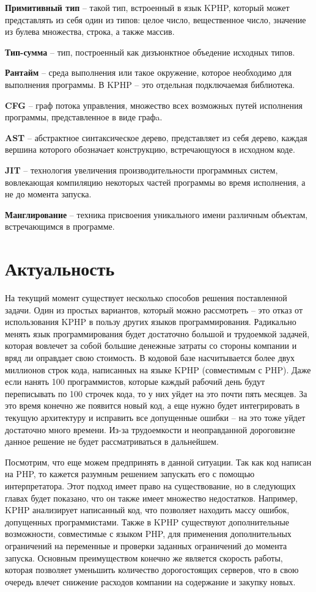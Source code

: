 \textbf{Примитивный тип} -- такой тип, встроенный в язык KPHP, который может представлять из себя один из типов: целое число, вещественное число, значение из булева множества, строка, а также массив.

\textbf{Тип-сумма} -- тип, построенный как дизъюнктное объедение исходных типов.

\textbf{Рантайм} -- среда выполнения или такое окружение, которое необходимо для выполнения программы. В KPHP -- это отдельная подключаемая библиотека.

\textbf{CFG} -- граф потока управления, множество всех возможных путей исполнения программы, представленное в виде графa.

\textbf{AST} -- абстрактное синтаксическое дерево, представляет из себя дерево, каждая вершина которого обозначает конструкцию, встречающуюся в исходном коде.

\textbf{JIT} -- технология увеличения производительности программных систем, вовлекающая компиляцию некоторых частей программы во время исполнения, а не до момента запуска.

\textbf{Манглирование} -- техника присвоения уникального имени различным объектам, встречающимся в программе.

\section{Актуальность}
\label{sec:actuality}
На текущий момент существует несколько способов решения поставленной задачи.
Один из простых вариантов, который можно рассмотреть -- это отказ от использования KPHP в пользу других языков программирования.
Радикально менять язык программирования будет достаточно большой и трудоемкой задачей, которая вовлечет за собой большие денежные затраты со стороны компании и вряд ли оправдает свою стоимость.
В кодовой базе насчитывается более двух миллионов строк кода, написанных на языке KPHP (совместимым с PHP).
Даже если нанять 100 программистов, которые каждый рабочий день будут переписывать по 100 строчек кода, то у них уйдет на это почти пять месяцев. За это время конечно же появится новый код, а еще нужно будет интегрировать в текущую архитектуру и исправить все допущенные ошибки -- на это тоже уйдет достаточно много времени.
Из-за трудоемкости и неоправданной дороговизне данное решение не будет рассматриваться в дальнейшем.

Посмотрим, что еще можем предпринять в данной ситуации. 
Так как код написан на PHP, то кажется разумным решением запускать его с помощью интерпретатора.
Этот подход имеет право на существование, но в следующих главах будет показано, что он также имеет множество недостатков.
Например, KPHP анализирует написанный код, что позволяет находить массу ошибок, допущенных программистами.
Также в KPHP существуют дополнительные возможности, совместимые с языком PHP, для применения дополнительных ограничений на переменные и проверки заданных ограничений до момента запуска.
Основным преимуществом конечно же является скорость работы, которая позволяет уменьшить количество дорогостоящих серверов, что в свою очередь влечет снижение расходов компании на содержание и закупку новых.

